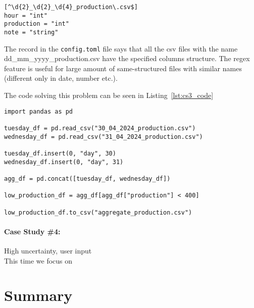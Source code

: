 \begin{lstlisting}[caption=config.toml of the second case study, label={lst:cs3_config}, captionpos=b]
[^\d{2}_\d{2}_\d{4}_production\.csv$]
hour = "int"
production = "int"
note = "string"
\end{lstlisting}

The record in the \verb|config.toml| file says that all the csv files with the name dd\_mm\_yyyy\_production.csv have the
specified columns structure.
The regex feature is useful for large amount of same-structured files with similar names (different only in date,
number etc.).

The code solving this problem can be seen in Listing~\ref{lst:cs3_code}

\begin{lstlisting}[caption=Solution of the third case study in Pandas, label={lst:cs3_code}, captionpos=b]
import pandas as pd

tuesday_df = pd.read_csv("30_04_2024_production.csv")
wednesday_df = pd.read_csv("31_04_2024_production.csv")

tuesday_df.insert(0, "day", 30)
wednesday_df.insert(0, "day", 31)

agg_df = pd.concat([tuesday_df, wednesday_df])

low_production_df = agg_df[agg_df["production"] < 400]

low_production_df.to_csv("aggregate_production.csv")
\end{lstlisting}

\paragraph{Case Study \#4:} High uncertainty, user input \\
This time we focus on


\section*{Summary}
